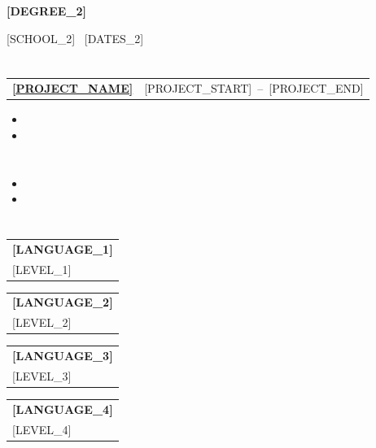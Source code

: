 \documentclass[10pt,a4paper]{article}
\makeatletter
\newenvironment{compactitem}{%
  \begin{itemize}
  \setlength{\itemsep}{2pt}\setlength{\topsep}{2pt}%
  \setlength{\parsep}{0pt}\setlength{\partopsep}{0pt}%
  \setlength{\leftmargin}{12pt}
}{\end{itemize}}
\newcommand{\entryrow}[2]{%
  \noindent\begin{tabularx}{\linewidth}{@{}X r@{}}
  {\fontsize{10}{12}\selectfont\bfseries #1} & {\fontsize{8.5}{10}\selectfont\color{graytext}#2}
  \end{tabularx}\par\vspace{1pt}}
\newcommand{\langcol}[2]{%
  \begin{tabular}[t]{@{}l@{}}
    {\fontsize{9}{11}\selectfont\bfseries #1}\\
    {\fontsize{8.5}{10}\selectfont\color{graytext}#2}
  \end{tabular}}
\makeatother
\begin{document}
\vspace{4pt}
{\fontsize{10}{12}\selectfont\bfseries [DEGREE_2]}\par
{\fontsize{9}{11}\selectfont\color{graytext}[SCHOOL_2] \textbullet\ [DATES_2]}

\section{}
\entryrow{\href{[PROJECT_URL]}{[PROJECT_NAME]}}{[PROJECT_START]~--~[PROJECT_END]}
\begin{compactitem}
  \item [BULLET]
  \item [BULLET]
\end{compactitem}

\section{}
\begin{compactitem}
  \item [BULLET]
  \item [BULLET]
\end{compactitem}

\section{}
\noindent\langcol{[LANGUAGE_1]}{[LEVEL_1]}\hspace{18pt}
\langcol{[LANGUAGE_2]}{[LEVEL_2]}\hspace{18pt}
\langcol{[LANGUAGE_3]}{[LEVEL_3]}\hspace{18pt}
\langcol{[LANGUAGE_4]}{[LEVEL_4]}
\end{document}
